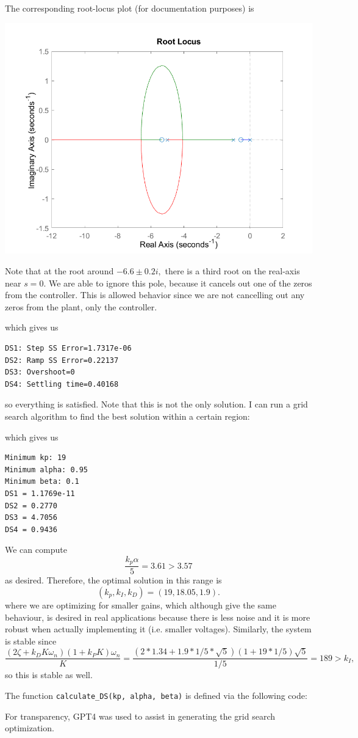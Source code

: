 \documentclass{article}
\begin{document}
\begin{enumerate}[label=\textbf{3.\arabic*}]
The corresponding root-locus plot (for documentation purposes) is 
\begin{center}
    \includegraphics[width=0.8\linewidth]{A3_imgs/A3_q6_locus.png}
\end{center}
Note that at the root around $-6.6 \pm 0.2i,$ there is a third root on the real-axis near $s=0.$ We are able to ignore this pole, because it cancels out one of the zeros from the controller. This is allowed behavior since we are not cancelling out any zeros from the plant, only the controller.



which gives us 
\begin{verbatim}
DS1: Step SS Error=1.7317e-06
DS2: Ramp SS Error=0.22137
DS3: Overshoot=0
DS4: Settling time=0.40168
\end{verbatim}
so everything is satisfied. Note that this is not the only solution. I can run a grid search algorithm to find the best solution within a certain region:

which gives us
\begin{verbatim}
Minimum kp: 19
Minimum alpha: 0.95
Minimum beta: 0.1
DS1 = 1.1769e-11
DS2 = 0.2770
DS3 = 4.7056
DS4 = 0.9436
\end{verbatim}
We can compute
\begin{equation}
    \frac{k_p\alpha}{5} = 3.61 > 3.57
\end{equation}
as desired. Therefore, the optimal solution in this range is 
\begin{equation}
    \boxed{(k_p, k_I, k_D) = (19, 18.05, 1.9)}.
\end{equation}
where we are optimizing for smaller gains, which although give the same behaviour, is desired in real applications because there is less noise and it is more robust when actually implementing it (i.e. smaller voltages). Similarly, the system is stable since
\begin{equation}
    \frac{(2\zeta+k_DK\omega_n)(1+k_PK)\omega_n}{K} = \frac{(2*1.34+1.9*1/5*\sqrt{5})(1+19*1/5)\sqrt{5}}{1/5} = 189> k_I,
\end{equation}
so this is stable as well.

The function \verb#calculate_DS(kp, alpha, beta)# is defined via the following code:

For transparency, GPT4 was used to assist in generating the grid search optimization.
\end{enumerate}
\end{document}
